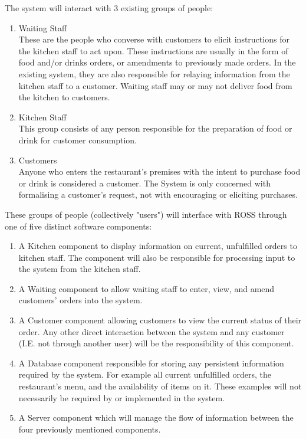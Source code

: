 \documentclass[11pt, a4paper]{report}
\begin{document}
The system will interact with 3 existing groups of people:
\begin{enumerate}
\item Waiting Staff\\
These are the people who converse with customers to elicit instructions for the kitchen staff to act upon. These instructions are usually in the form of food and/or drinks orders, or amendments to previously made orders. In the existing system, they are also responsible for relaying information from the kitchen staff to a customer. Waiting staff may or may not deliver food from the kitchen to customers.
\item Kitchen Staff\\
This group consists of any person responsible for the preparation of food or drink for customer consumption.
\item Customers\\
Anyone who enters the restaurant's premises with the intent to purchase food or drink is considered a customer. The System is only concerned with formalising a customer's request, not with encouraging or eliciting purchases.
\end{enumerate}

\noindent
These groups of people (collectively "users") will interface with ROSS through one of five distinct software components:
\begin{enumerate}
\item A Kitchen component to display information on current, unfulfilled orders to kitchen staff. The component will also be responsible for processing input to the system from the kitchen staff.
\item A Waiting component to allow waiting staff to enter, view, and amend customers' orders into the system.
\item A Customer component allowing customers to view the current status of their order. Any other direct interaction between the system and any customer (I.E. not through another user) will be the responsibility of this component.
\item A Database component responsible for storing any persistent information required by the system. For example all current unfulfilled orders, the restaurant's menu, and the availability of items on it. These examples will not necessarily be required by or implemented in the system.
\item A Server component which will manage the flow of information between the four previously mentioned components.
\end{enumerate}
\end{document}
